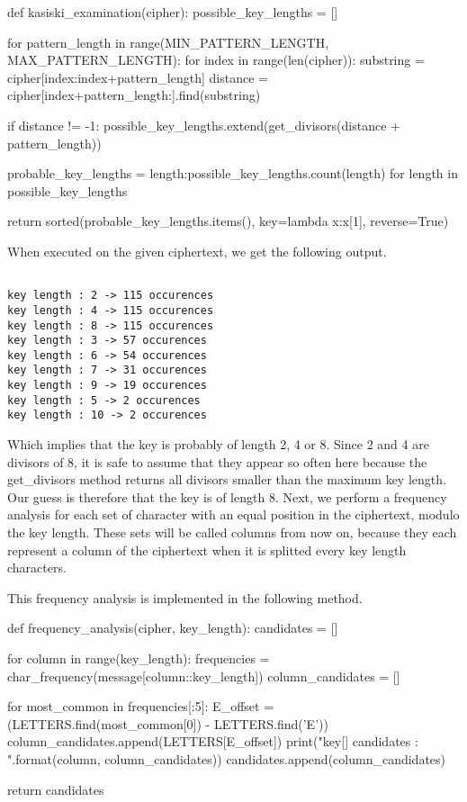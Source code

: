 \documentclass{article}
\begin{document}
\begin{python}
def kasiski_examination(cipher):
    possible_key_lengths = []

    for pattern_length in range(MIN_PATTERN_LENGTH, MAX_PATTERN_LENGTH):
        for index in range(len(cipher)):
            substring = cipher[index:index+pattern_length]
            distance = cipher[index+pattern_length:].find(substring)

            if distance != -1:
                possible_key_lengths.extend(get_divisors(distance + pattern_length))

    probable_key_lengths = {length:possible_key_lengths.count(length) for length in possible_key_lengths}

    return sorted(probable_key_lengths.items(), key=lambda x:x[1], reverse=True)
\end{python}

When executed on the given ciphertext, we get the following output.

\begin{verbatim}

key length : 2 -> 115 occurences
key length : 4 -> 115 occurences
key length : 8 -> 115 occurences
key length : 3 -> 57 occurences
key length : 6 -> 54 occurences
key length : 7 -> 31 occurences
key length : 9 -> 19 occurences
key length : 5 -> 2 occurences
key length : 10 -> 2 occurences

\end{verbatim}

Which implies that the key is probably of length 2, 4 or 8. Since 2 and 4 are divisors of 8, it is safe to assume that they appear so often here because the get\_divisors method returns all divisors smaller than the maximum key length. Our guess is therefore that the key is of length 8.
Next, we perform a frequency analysis for each set of character with an equal position in the ciphertext, modulo the key length. These sets will be called columns from now on, because they each represent a column of the ciphertext when it is splitted every key length characters.

This frequency analysis is implemented in the following method. 

\begin{python}

def frequency_analysis(cipher, key_length):
    candidates = []

    for column in range(key_length):
        frequencies = char_frequency(message[column::key_length])
        column_candidates = []

        for most_common in frequencies[:5]:
            E_offset = (LETTERS.find(most_common[0]) - LETTERS.find('E')) %
            column_candidates.append(LETTERS[E_offset])
        print("key[{}] candidates : {}".format(column, column_candidates))
        candidates.append(column_candidates)

    return candidates
    
\end{python}
\end{document}
